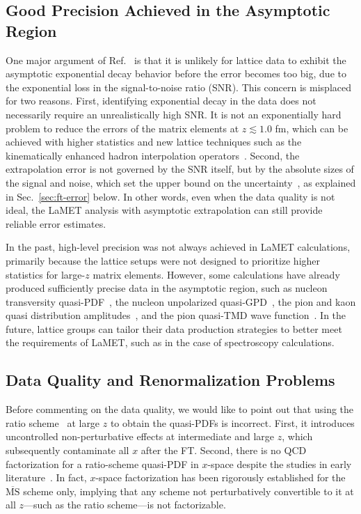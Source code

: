 \documentclass[prd,twocolumn,superscriptaddress,preprintnumbers,showpacs,nofootinbib,notitlepage,floatfix]{revtex4-2}
\DeclareRobustCommand{\sec}[1]{Sec.~\ref{sec:#1}}
\begin{document}
\subsection{Good Precision Achieved in the Asymptotic Region}
\label{sec:exp-decay}

One major argument of Ref.~\cite{Dutrieux:2025jed} is that it is unlikely for lattice data to exhibit the asymptotic exponential decay behavior before the error becomes too big, due to the exponential loss in the signal-to-noise ratio (SNR). This concern is misplaced for two reasons. First, identifying exponential decay in the data does not necessarily require an unrealistically high SNR. It is not an exponentially hard problem to reduce the errors of the matrix elements at $z\lesssim 1.0$ fm, which can be achieved with higher statistics and new lattice techniques such as the kinematically enhanced hadron interpolation operators~\cite{Zhang:2025hyo}. Second, the extrapolation error is not governed by the SNR itself, but by the absolute sizes of the signal and noise, which set the upper bound on the uncertainty~\cite{Gao:2021dbh}, as explained in \sec{ft-error} below. In other words, even when the data quality is not ideal,
the LaMET analysis with asymptotic extrapolation can still provide reliable error estimates. 

In the past, high-level precision was not always achieved in LaMET calculations, primarily because the lattice setups were not designed to prioritize higher statistics for large-$z$ matrix elements.
However, some calculations have already produced sufficiently precise data in the asymptotic region, such as nucleon transversity quasi-PDF~\cite{LatticeParton:2022xsd}, the nucleon unpolarized quasi-GPD~\cite{Holligan:2023jqh}, the pion and kaon quasi distribution amplitudes~\cite{LatticeParton:2022zqc}, and the pion quasi-TMD wave function~\cite{Avkhadiev:2024mgd}.
In the future, lattice groups can tailor their data production strategies to better meet the requirements of LaMET, such as in the case of spectroscopy calculations.

\subsection{Data Quality and Renormalization Problems}
\label{sec:ill-method}

Before commenting on the data quality, we would like to point out that using the ratio scheme~\cite{Orginos:2017kos} at large $z$ to obtain the quasi-PDFs is incorrect. First, it introduces uncontrolled non-perturbative effects at intermediate and large $z$, which subsequently contaminate all $x$ after the FT. Second, there is no QCD factorization for a ratio-scheme quasi-PDF in $x$-space despite the studies in early literature~\cite{Radyushkin:2017lvu,Zhang:2018ggy,Izubuchi:2018srq}. In fact, $x$-space factorization has been rigorously established for the $\overline{\mathrm{MS}}$ scheme only, implying that any scheme not perturbatively convertible to it at all $z$---such as the ratio scheme---is not factorizable.
\end{document}
